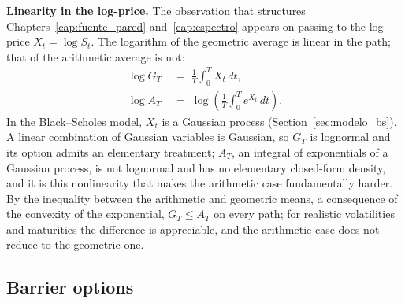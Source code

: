 \medskip

\noindent\textbf{Linearity in the log-price.}
The observation that structures Chapters~\ref{cap:fuente_pared}
and~\ref{cap:espectro}\enprep{} appears on passing to the log-price $X_t = \log S_t$.
The logarithm of the geometric average is linear in the path; that of
the arithmetic average is not:
\begin{align}
  \log G_T &\;=\; \frac{1}{T}\int_0^T X_t\, dt,
  \label{eq:log_geom_lineal}\\
  \log A_T &\;=\; \log\!\left(\frac{1}{T}\int_0^T e^{X_t}\, dt\right).
  \label{eq:log_arit_no_lineal}
\end{align}
In the Black--Scholes model, $X_t$ is a Gaussian process
(Section~\ref{sec:modelo_bs}). A linear
combination of Gaussian variables is Gaussian, so $G_T$ is lognormal and
its option admits an elementary treatment; $A_T$, an integral of
exponentials of a Gaussian process, is not lognormal and has no
elementary closed-form density, and it is this nonlinearity that makes
the arithmetic case fundamentally harder. By the inequality between the
arithmetic and geometric means, a consequence of the convexity of the
exponential, $G_T \leq A_T$ on every path; for realistic volatilities
and maturities the difference is appreciable, and the arithmetic case
does not reduce to the geometric one.

\subsection{Barrier options}
\label{subsec:barrera_unica_payoff}\label{sec:barrera_definicion}
\label{subsec:doble_barrera_otros_tipos}

